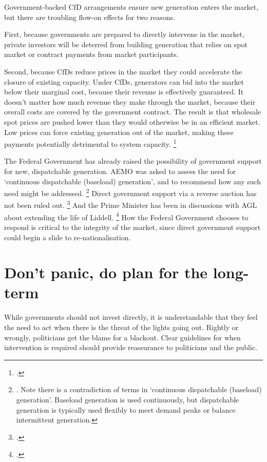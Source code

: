 \documentclass[FrontPage]{grattan}
\begin{document}
Government-backed CfD arrangements ensure new generation enters the market, but there are troubling flow-on effects for two reasons.

First, because governments are prepared to directly intervene in the market, private investors will be deterred from building generation that relies on spot market or contract payments from market participants.

Second, because CfDs reduce prices in the market they could accelerate the closure of existing capacity. Under CfDs, generators can bid into the market below their marginal cost, because their revenue is effectively guaranteed. It doesn't matter how much revenue they make through the market, because their overall costs are covered by the government contract. The result is that wholesale spot prices are pushed lower than they would otherwise be in an efficient market. Low prices can force existing generation out of the market, making these payments potentially detrimental to system capacity.%
\footcite{EC2015CapacityMechanisms}

The Federal Government has already raised the possibility of government support for new, dispatchable generation. AEMO was asked to assess the need for `continuous dispatchable (baseload) generation', and to recommend how any such need might be addressed.%
\footnote{\textcite{Turnbull2017FinkelResponse}. Note there is a contradiction of terms in `continuous dispatchable (baseload) generation'. Baseload generation is used continuously, but dispatchable generation is typically used flexibly to meet demand peaks or balance intermittent generation.}
Direct government support via a reverse auction has not been ruled out.%
\footcites{Turnbull2017FinkelResponse}{Murphy2017TurnbullLeavesCETopen}
And the Prime Minister has been in discussions with AGL about extending the life of Liddell.%
\footcite{Grattan2017AGLrejectsTurnbull}
How the Federal Government chooses to respond is critical to the integrity of the market, since direct government support could begin a slide to re-nationalisation.

\section{Don't panic, do plan for the long-term}\label{sec:NEM-already-has-a-safety-net}
While governments should not invest directly, it is understandable that they feel the need to act when there is the threat of the lights going out. Rightly or wrongly, politicians get the blame for a blackout. Clear guidelines for when intervention is required should provide reassurance to politicians and the public.
\end{document}

